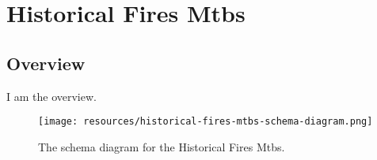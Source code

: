 
\section{Historical Fires Mtbs}
\label{sec:historical-fires-mtbs}
\subsection{Overview}
\label{ssec:overview}

I am the overview.

\begin{figure}[h!]
  \begin{center}
    \texttt{[image: resources/historical-fires-mtbs-schema-diagram.png]}
  \end{center}
  \caption{The schema diagram for the Historical Fires Mtbs.}
  \label{fig:ov-diagram}
\end{figure}


